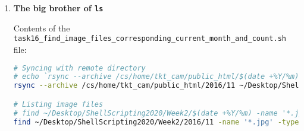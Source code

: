 \documentclass[9pt]{article}
\begin{document}
\begin{enumerate}
\begin{lstlisting}[language=bash,breaklines=true]
# Listing files, directories and subdirectories
# echo `ls -R ~/Desktop/ShellScripting2020/Week2/$(date +%Y/%m) | grep jpg | wc -l`
ls -R ~/Desktop/ShellScripting2020/Week2/2016/11 | grep jpg | wc -l
		\end{lstlisting}

	\item \textbf{The big brother of \texttt{ls}}
	
		Contents of the \texttt{task16\_find\_image\_files\_corresponding\_current\_month\_and\_count.sh} file:
		\begin{lstlisting}[language=bash,breaklines=true]
# Syncing with remote directory
# echo `rsync --archive /cs/home/tkt_cam/public_html/$(date +%Y/%m) ~/Desktop/ShellScripting2020/Week2/$(date +%Y) --stats`
rsync --archive /cs/home/tkt_cam/public_html/2016/11 ~/Desktop/ShellScripting2020/Week2/2016/11 --stats

# Listing image files
# find ~/Desktop/ShellScripting2020/Week2/$(date +%Y/%m) -name '*.jpg' -type f | wc -l
find ~/Desktop/ShellScripting2020/Week2/2016/11 -name '*.jpg' -type f | wc -l
		\end{lstlisting}

\end{enumerate}
\end{document}
